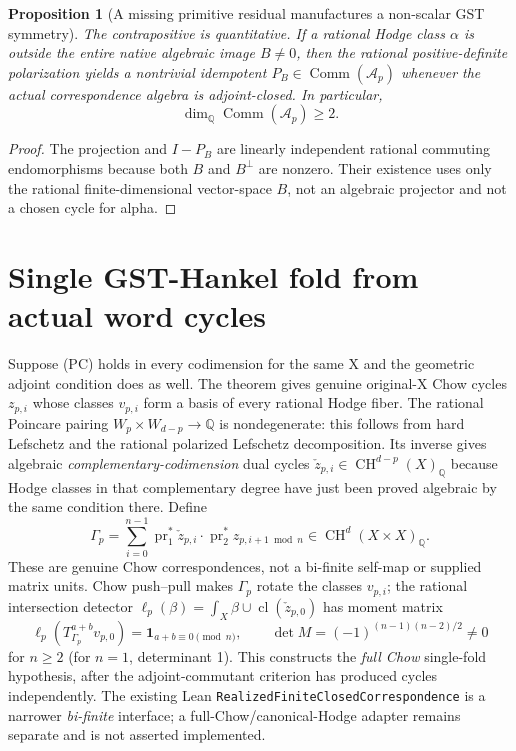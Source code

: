 \documentclass[11pt]{article}
\newtheorem{proposition}{Proposition}
\newcommand{\Q}{\mathbb Q}
\newcommand{\CH}{\operatorname{CH}}
\newcommand{\cl}{\operatorname{cl}}
\newcommand{\Comm}{\operatorname{Comm}}
\begin{document}
\begin{proposition}[A missing primitive residual manufactures a non-scalar GST symmetry]
The contrapositive is quantitative. If a rational Hodge class $\alpha$ is outside the entire native algebraic image $B\ne0$, then the rational positive-definite polarization yields a nontrivial idempotent $P_B\in\Comm(\mathcal A_p)$ whenever the actual correspondence algebra is adjoint-closed. In particular,
\[
 \boxed{\dim_\Q\Comm(\mathcal A_p)\ge2.}
\]
\end{proposition}
\begin{proof}
The projection and $I-P_B$ are linearly independent rational commuting endomorphisms because both $B$ and $B^\perp$ are nonzero. Their existence uses only the rational finite-dimensional vector-space $B$, not an algebraic projector and not a chosen cycle for alpha.
\end{proof}

\section{Single GST-Hankel fold from actual word cycles}
Suppose (PC) holds in every codimension for the same X and the geometric adjoint condition does as well. The theorem gives genuine original-X Chow cycles $z_{p,i}$ whose classes $v_{p,i}$ form a basis of every rational Hodge fiber. The rational Poincare pairing $W_p\times W_{d-p}\to\Q$ is nondegenerate: this follows from hard Lefschetz and the rational polarized Lefschetz decomposition. Its inverse gives algebraic \emph{complementary-codimension} dual cycles $\check z_{p,i}\in\CH^{d-p}(X)_\Q$ because Hodge classes in that complementary degree have just been proved algebraic by the same condition there. Define
\[
 \Gamma_p=\sum_{i=0}^{n-1}
 \operatorname{pr}_1^*\check z_{p,i}\cdot
 \operatorname{pr}_2^*z_{p,i+1\bmod n}
 \in\CH^d(X\times X)_\Q.
\]
These are genuine Chow correspondences, not a bi-finite self-map or supplied matrix units. Chow push--pull makes $\Gamma_p$ rotate the classes $v_{p,i}$; the rational intersection detector $\ell_p(\beta)=\int_X\beta\cup\cl(\check z_{p,0})$ has moment matrix
\[
 \ell_p(T_{\Gamma_p}^{a+b}v_{p,0})=
 \mathbf1_{a+b\equiv0\pmod n},
\qquad
 \boxed{\det M=(-1)^{(n-1)(n-2)/2}\ne0}
\]
for $n\ge2$ (for $n=1$, determinant 1). This constructs the \emph{full Chow} single-fold hypothesis, after the adjoint-commutant criterion has produced cycles independently. The existing Lean \texttt{RealizedFiniteClosedCorrespondence} is a narrower \emph{bi-finite} interface; a full-Chow/canonical-Hodge adapter remains separate and is not asserted implemented.
\end{document}
